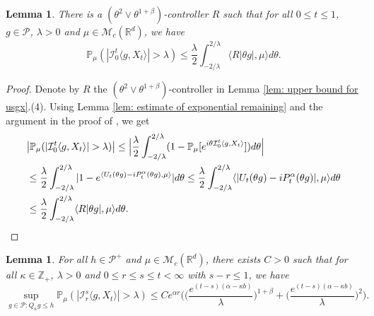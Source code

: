 \documentclass[12pt,a4paper]{amsart}
\theoremstyle{plain}
\newtheorem{lem}[thm]{Lemma}
\theoremstyle{definition}
\numberwithin{equation}{section}
\begin{document}
\begin{lem}
\label{lem: control pair for P(M>lambda)}
    There is a $(\theta^2\vee\theta^{1+\beta})$-controller $R$ such that for all $0\leq t\leq 1$, $g\in \mathcal P$, $\lambda >0$ and $\mu\in \mathcal M_c(\mathbb R^d)$, we have
\[
    \mathbb P_\mu ( |\mathcal{I}_0^t\langle g,X_t\rangle| > \lambda)
    \leq \frac{\lambda}{2}\int_{-2/\lambda}^{2/\lambda}\langle R|\theta g|,\mu\rangle d\theta.
\]
\end{lem}

\begin{proof}
    Denote by $R$ the $(\theta^2\vee\theta^{1+\beta})$-controller in Lemma \ref{lem: upper bound for usgx}.(4).
    Using Lemma \ref{lem: estimate of exponential remaining} and the argument in the proof of \cite[Theorem 3.3.6]{Durrett2010Probability}, we get
\begin{align}
    &\big|\mathbb P_\mu (|\mathcal{I}_0^t\langle g,X_t\rangle| > \lambda)\big|
    \leq \Big|\frac{\lambda}{2}\int_{-2/\lambda}^{2/\lambda}(1 - \mathbb P_\mu[e^{i\theta \mathcal{I}_0^t\langle g,X_t\rangle}])d\theta\Big|
    \\&\leq \frac{\lambda}{2}\int_{-2/\lambda}^{2/\lambda}|1-e^{\langle U_t(\theta g)-iP^\alpha_t (\theta g),\mu \rangle}|d\theta
    \leq \frac{\lambda}{2}\int_{-2/\lambda}^{2/\lambda}\langle |U_t(\theta g) - iP^\alpha_t(\theta g)|,\mu\rangle d\theta
    \\&\leq \frac{\lambda}{2}\int_{-2/\lambda}^{2/\lambda}\langle R|\theta g|,\mu\rangle d\theta.
      \qedhere
\end{align}
\end{proof}
\begin{lem}\label{lem: temp}
    For all $h \in \mathcal P^+$ and $\mu \in \mathcal M_c(\mathbb R^d)$, there exists $C > 0$ such that
       for all $\kappa \in \mathbb Z_+ $, $\lambda > 0$ and $0\leq r\leq s\leq t<\infty$ with $s-r \leq 1$, we have
\[
    \sup_{g \in \mathcal P: Q_\kappa g\leq h}\mathbb P_{\mu}(|\mathcal I_r^s\langle g, X_t\rangle|>\lambda)
    \leq C e^{\alpha r} \bigg(\Big( \frac{e^{(t-s)(\alpha - \kappa b)}}{\lambda}\Big)^{1+\beta} + \Big( \frac{e^{(t-s)(\alpha - \kappa b)}}{\lambda}\Big)^{2} \bigg).
\]
\end{lem}
\end{document}
